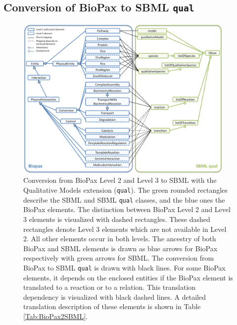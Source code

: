 \documentclass{bioinfo}
\newcommand{\qual}{\texttt{qual}}
\begin{document}
\begin{methods}
\subsection{Conversion of BioPax to SBML \qual}
\begin{figure}[t!h]
\centering \includegraphics[width=0.95\textwidth]{BioPaxSBMLqual.png}
\caption{Conversion from BioPax Level 2 and Level 3 to SBML with the Qualitative Models extension (\qual).
The green rounded rectangles describe the SBML and SBML \qual{} classes, and the blue ones the BioPax elements.
The distinction between BioPax Level 2 and Level 3 elements is visualized with dashed rectangles.
These dashed rectangles denote Level 3 elements which are not available in Level 2.
All other elements occur in both levels.
The ancestry of both BioPax and SBML elements is drawn as blue arrows for BioPax respectively with green arrows for SBML.
The conversion from BioPax to SBML \qual{} is drawn with black lines.
For some BioPax elements, it depends on the enclosed entities if the BioPax element is translated to a reaction or to a relation.
This translation dependency is visualized with black dashed lines.
A detailed translation description of these elements is shown in Table \ref{Tab:BioPax2SBML}.}
\label{fig:BioPaxSBMLqual}
\end{figure}


\end{methods}
\end{document}
